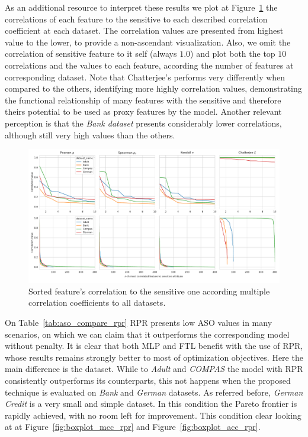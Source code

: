 As an additional resource to interpret these results we plot at Figure~\ref{fig:datasets_correlation} the correlations of each feature to the sensitive to each described correlation coefficient at each dataset. The correlation values are presented from highest value to the lower, to provide a non-ascendant visualization. Also, we omit the correlation of sensitive feature to it self (always $1.0$) and plot both the top $10$ correlations and the values to each feature, according the number of features at corresponding dataset. Note that Chatterjee's performs very differently when compared to the others, identifying more highly correlation values, demonstrating the functional relationship of many features with the sensitive and therefore theirs potential to be used as proxy features by the model. Another relevant perception is that the \textit{Bank dataset} presents considerably lower correlations, although still very high values than the others.  

\begin{figure}[!ht]
\centering
\caption{Sorted feature's correlation to the sensitive one according multiple correlation coefficients to all datasets.}\label{fig:datasets_correlation}
\includegraphics[width=1\linewidth]{images/dataset_correlation_plots.pdf}
\end{figure}

On Table~\ref{tab:aso_compare_rpr} RPR presents low ASO values in many scenarios, on which we can claim that it outperforms the corresponding model without penalty. It is clear that both MLP and FTL benefit with the use of RPR, whose results remains strongly better to most of optimization objectives. Here the main difference is the dataset. While to \textit{Adult} and \textit{COMPAS} the model with RPR consistently outperforms its counterparts, this not happens when the proposed technique is evaluated on \textit{Bank} and \textit{German} datasets. As referred before, \textit{German Credit} is a very small and simple dataset. In this condition the Pareto frontier is rapidly achieved, with no room left for improvement. This condition clear looking at at Figure~\ref{fig:boxplot_mcc_rpr} and Figure~\ref{fig:boxplot_acc_rpr}.  

